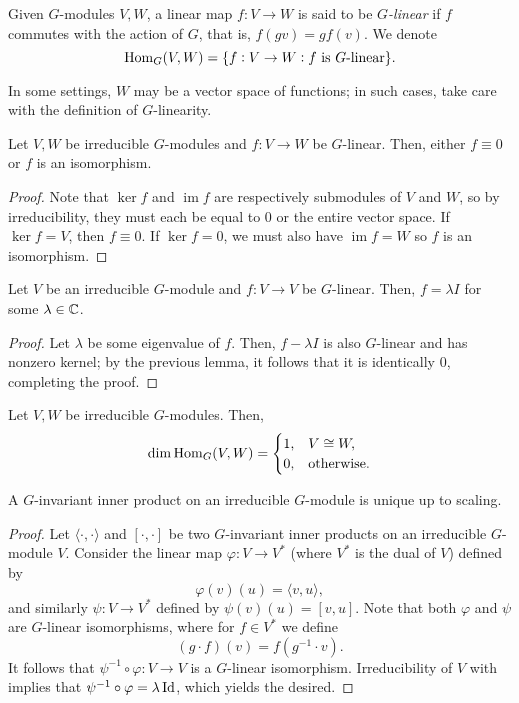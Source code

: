 	\begin{fdef}
		Given $G$-modules $V,W$, a linear map $f : V \to W$ is said to be \emph{$G$-linear} if $f$ commutes with the action of $G$, that is, $f(gv) = gf(v)$. We denote
		\[ \operatorname{Hom}_G(V,W) = \{ f : V \to W : f \text{ is $G$-linear} \}. \]
	\end{fdef}

	In some settings, $W$ may be a vector space of functions; in such cases, take care with the definition of $G$-linearity.

	\begin{flem}
		Let $V,W$ be irreducible $G$-modules and $f : V \to W$ be $G$-linear. Then, either $f \equiv 0$ or $f$ is an isomorphism.
	\end{flem}
	\begin{proof}
		Note that $\ker f$ and $\operatorname{im} f$ are respectively submodules of $V$ and $W$, so by irreducibility, they must each be equal to $0$ or the entire vector space. If $\ker f = V$, then $f \equiv 0$. If $\ker f = 0$, we must also have $\operatorname{im} f = W$ so $f$ is an isomorphism.
	\end{proof}

	\begin{flem}
		\label{schur's lemma}
		Let $V$ be an irreducible $G$-module and $f : V \to V$ be $G$-linear. Then, $f = \lambda I$ for some $\lambda \in \mathbb{C}$.
	\end{flem}
	\begin{proof}
		Let $\lambda$ be some eigenvalue of $f$. Then, $f - \lambda I$ is also $G$-linear and has nonzero kernel; by the previous lemma, it follows that it is identically $0$, completing the proof.
	\end{proof}

	\begin{fcor}
		Let $V,W$ be irreducible $G$-modules. Then,
		\[ \dim \operatorname{Hom}_G(V,W) = \begin{cases} 1, & V \cong W, \\ 0, & \text{otherwise.} \end{cases} \]
	\end{fcor}

	\begin{fcor}
		\label{irred-unique-inner-prod}
		A $G$-invariant inner product on an irreducible $G$-module is unique up to scaling.
	\end{fcor}
	\begin{proof}
		Let $\langle\cdot,\cdot\rangle$ and $[\cdot,\cdot]$ be two $G$-invariant inner products on an irreducible $G$-module $V$.
		Consider the linear map $\varphi : V \to V^*$ (where $V^*$ is the dual of $V$) defined by
		\[ \varphi(v)(u) = \langle v,u\rangle, \]
		and similarly $\psi : V \to V^*$ defined by $\psi(v)(u) = [v,u]$. Note that both $\varphi$ and $\psi$ are $G$-linear isomorphisms, where for $f \in V^*$ we define
		\[ (g \cdot f)(v) = f(g^{-1} \cdot v). \]
		It follows that $\psi^{-1} \circ \varphi : V \to V$ is a $G$-linear isomorphism. Irreducibility of $V$ with  implies that $\psi^{-1} \circ \varphi = \lambda \operatorname{Id}$, which yields the desired.
	\end{proof}

